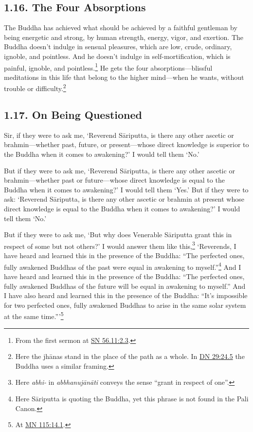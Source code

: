 \documentclass[12pt,openany]{book}%
\begin{document}
\subsection*{1.16. The Four Absorptions }

The Buddha has achieved what should be achieved by a faithful gentleman by being energetic and strong, by human strength, energy, vigor, and exertion. The Buddha doesn’t indulge in sensual pleasures, which are low, crude, ordinary, ignoble, and pointless. And he doesn’t indulge in self-mortification, which is painful, ignoble, and pointless.\footnote{From the first sermon at \href{https://suttacentral.net/sn56.11/en/sujato\#2.3}{SN 56.11:2.3}. } He gets the four absorptions—blissful meditations in this life that belong to the higher mind—when he wants, without trouble or difficulty.\footnote{Here the \textsanskrit{jhānas} stand in the place of the path as a whole. In \href{https://suttacentral.net/dn29/en/sujato\#24.5}{DN 29:24.5} the Buddha uses a similar framing. } 

\subsection*{1.17. On Being Questioned }

Sir, if they were to ask me, ‘Reverend \textsanskrit{Sāriputta}, is there any other ascetic or brahmin—whether past, future, or present—whose direct knowledge is superior to the Buddha when it comes to awakening?’ I would tell them ‘No.’ 

But if they were to ask me, ‘Reverend \textsanskrit{Sāriputta}, is there any other ascetic or brahmin—whether past or future—whose direct knowledge is equal to the Buddha when it comes to awakening?’ I would tell them ‘Yes.’ But if they were to ask: ‘Reverend \textsanskrit{Sāriputta}, is there any other ascetic or brahmin at present whose direct knowledge is equal to the Buddha when it comes to awakening?’ I would tell them ‘No.’ 

But if they were to ask me, ‘But why does Venerable \textsanskrit{Sāriputta} grant this in respect of some but not others?’ I would answer them like this,\footnote{Here \textit{abhi-} in \textit{\textsanskrit{abbhanujānāti}} conveys the sense “grant in respect of one”. } ‘Reverends, I have heard and learned this in the presence of the Buddha: “The perfected ones, fully awakened Buddhas of the past were equal in awakening to myself.”\footnote{Here \textsanskrit{Sāriputta} is quoting the Buddha, yet this phrase is not found in the Pali Canon. } And I have heard and learned this in the presence of the Buddha: “The perfected ones, fully awakened Buddhas of the future will be equal in awakening to myself.” And I have also heard and learned this in the presence of the Buddha: “It’s impossible for two perfected ones, fully awakened Buddhas to arise in the same solar system at the same time.”’\footnote{At \href{https://suttacentral.net/mn115/en/sujato\#14.1}{MN 115:14.1}. } 
\end{document}

